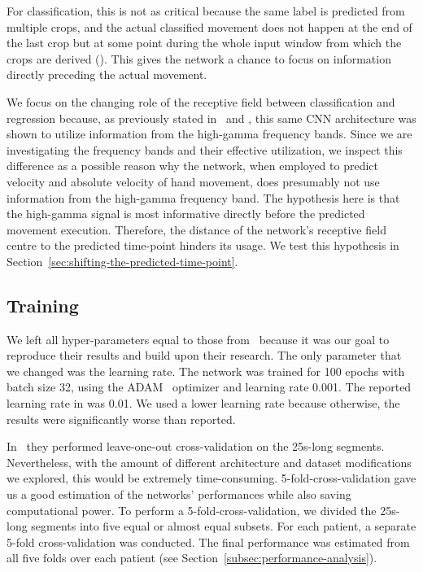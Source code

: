 For classification, this is not as critical because the same label is predicted from multiple crops, and the actual classified movement does not happen at the end of the last crop but at some point during the whole input window from which the crops are derived (\cite{schirrmeister-deep-2017}).
This gives the network a chance to focus on information directly preceding the actual movement.

We focus on the changing role of the receptive field between classification and regression because, as previously stated in~\cite{schirrmeister-deep-2017} and \cite{hartmann-hierarchical-2018}, this same CNN architecture was shown to utilize information from the high-gamma frequency bands.
Since we are investigating the frequency bands and their effective utilization, we inspect this difference as a possible reason why the network, when employed to predict velocity and absolute velocity of hand movement, does presumably not use information from the high-gamma frequency band.
The hypothesis here is that the high-gamma signal is most informative directly before the predicted movement execution.
Therefore, the distance of the network's receptive field centre to the predicted time-point hinders its usage.
We test this hypothesis in Section~\ref{sec:shifting-the-predicted-time-point}.

\subsection{Training}\label{subsec:training}
We left all hyper-parameters equal to those from~\cite{Hammer-2021} because it was our goal to reproduce their results and build upon their research.
The only parameter that we changed was the learning rate.
The network was trained for 100 epochs with batch size 32, using the ADAM~ optimizer and learning rate 0.001.
The reported learning rate in \cite{Hammer-2021} was 0.01.
We used a lower learning rate because otherwise, the results were significantly worse than reported.

In~\cite{Hammer-2021} they performed leave-one-out cross-validation on the 25s-long segments.
Nevertheless, with the amount of different architecture and dataset modifications we explored, this would be extremely time-consuming.
5-fold-cross-validation gave us a good estimation of the networks' performances while also saving computational power. 
To perform a 5-fold-cross-validation, we divided the 25s-long segments into five equal or almost equal subsets.
For each patient, a separate 5-fold cross-validation was conducted.
The final performance was estimated from all five folds over each patient (see Section~\ref{subsec:performance-analysis}).


